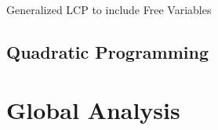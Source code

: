 Generalized LCP to include Free Variables



\subsection{Quadratic Programming}\label{sec:quadratic_programming}



\section{Global Analysis}\label{sec:global_analysis}
